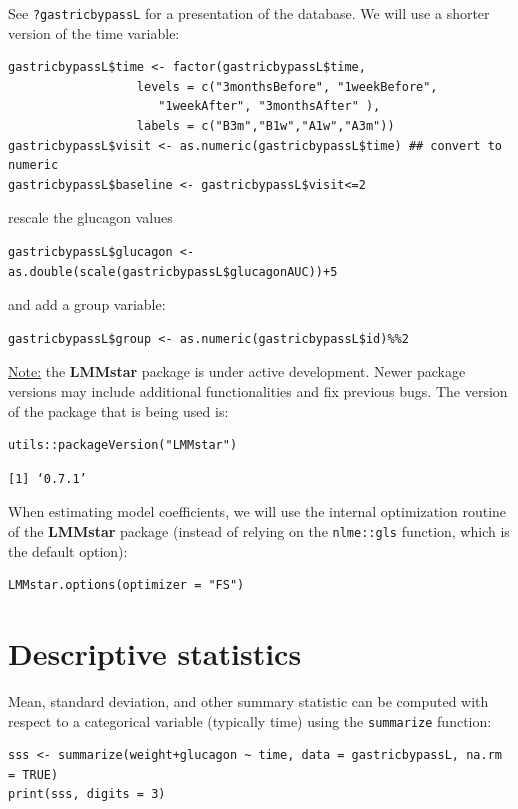 \documentclass[12pt]{article}
\begin{document}
See \texttt{?gastricbypassL} for a presentation of the database. We will use a shorter version of the time variable:
\lstset{language=r,label= ,caption= ,captionpos=b,numbers=none}
\begin{lstlisting}
gastricbypassL$time <- factor(gastricbypassL$time,
			      levels = c("3monthsBefore", "1weekBefore",
					 "1weekAfter", "3monthsAfter" ),
			      labels = c("B3m","B1w","A1w","A3m"))
gastricbypassL$visit <- as.numeric(gastricbypassL$time) ## convert to numeric
gastricbypassL$baseline <- gastricbypassL$visit<=2
\end{lstlisting}
rescale the glucagon values
\lstset{language=r,label= ,caption= ,captionpos=b,numbers=none}
\begin{lstlisting}
gastricbypassL$glucagon <- as.double(scale(gastricbypassL$glucagonAUC))+5
\end{lstlisting}

and add a group variable:
\lstset{language=r,label= ,caption= ,captionpos=b,numbers=none}
\begin{lstlisting}
gastricbypassL$group <- as.numeric(gastricbypassL$id)%%2
\end{lstlisting}

\bigskip

\uline{Note:} the \textbf{LMMstar} package is under active development. Newer
package versions may include additional functionalities and fix
previous bugs. The version of the package that is being used is:
\lstset{language=r,label= ,caption= ,captionpos=b,numbers=none}
\begin{lstlisting}
utils::packageVersion("LMMstar")
\end{lstlisting}

\begin{verbatim}
[1] ‘0.7.1’
\end{verbatim}


When estimating model coefficients, we will use the internal
optimization routine of the \textbf{LMMstar} package (instead of relying on
the \texttt{nlme::gls} function, which is the default option):
\lstset{language=r,label= ,caption= ,captionpos=b,numbers=none}
\begin{lstlisting}
LMMstar.options(optimizer = "FS")
\end{lstlisting}

\clearpage

\section{Descriptive statistics}
\label{sec:org6f22cb1}
Mean, standard deviation, and other summary statistic can be computed
with respect to a categorical variable (typically time) using the
\texttt{summarize} function:
\lstset{language=r,label= ,caption= ,captionpos=b,numbers=none}
\begin{lstlisting}
sss <- summarize(weight+glucagon ~ time, data = gastricbypassL, na.rm = TRUE)
print(sss, digits = 3)
\end{lstlisting}
\end{document}
